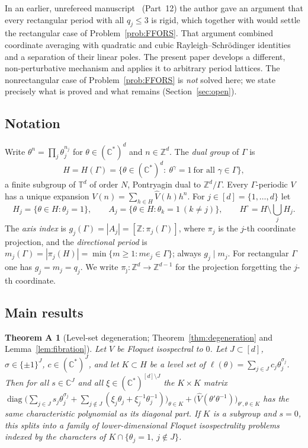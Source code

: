 \documentclass[11pt,reqno]{amsart}
\newtheorem*{theoremA}{Theorem A}
\theoremstyle{definition}
\theoremstyle{remark}
\newcommand{\C}{\mathbb C}
\newcommand{\Z}{\mathbb Z}
\newcommand{\T}{\mathbb T}
\DeclareMathOperator{\diag}{diag}
\begin{document}
In an earlier, unrefereed manuscript~\cite{KeioGPT} (Part~12) the author gave an
argument that every rectangular period with all $q_j\le3$ is rigid, which
together with \cite[Theorem~C]{CFK2026} would settle the rectangular case of
Problem~\ref{prob:FFORS}.  That argument combined coordinate averaging with
quadratic and cubic Rayleigh--Schr\"odinger identities and a separation of
their linear poles.  The present paper develops a different, non-perturbative
mechanism and applies it to arbitrary period lattices.  The nonrectangular
case of Problem~\ref{prob:FFORS} is \emph{not} solved here; we state precisely
what is proved and what remains (Section~\ref{sec:open}).

\subsection{Notation}
Write $\theta^n=\prod_j\theta_j^{n_j}$ for $\theta\in(\C^*)^d$ and $n\in\Z^d$.
The \emph{dual group} of $\Gamma$ is
\[
 H=H(\Gamma)=\{\theta\in(\C^*)^d:\ \theta^\gamma=1\ \text{for all }\gamma\in\Gamma\},
\]
a finite subgroup of $\T^d$ of order $N$, Pontryagin dual to $\Z^d/\Gamma$.
Every $\Gamma$-periodic $V$ has a unique expansion
$V(n)=\sum_{h\in H}\widehat V(h)h^n$.  For $j\in[d]=\{1,\dots,d\}$ let
\[
 H_j=\{\theta\in H:\theta_j=1\},\qquad
 A_j=\{\theta\in H:\theta_k=1\ (k\ne j)\},\qquad
 H^\circ=H\setminus\textstyle\bigcup_jH_j .
\]
The \emph{axis index} is $g_j(\Gamma)=|A_j|=[\Z:\pi_j(\Gamma)]$, where $\pi_j$ is
the $j$-th coordinate projection, and the \emph{directional period} is
$m_j(\Gamma)=|\pi_j(H)|=\min\{m\ge1: me_j\in\Gamma\}$; always $g_j\mid m_j$.
For rectangular $\Gamma$ one has $g_j=m_j=q_j$.  We write
$\pi_{\hat\jmath}\colon\Z^d\to\Z^{d-1}$ for the projection forgetting the $j$-th
coordinate.

\subsection{Main results}

\begin{theoremA}[Level-set degeneration; Theorem~\ref{thm:degeneration} and Lemma~\ref{lem:fibration}]
Let $V$ be Floquet isospectral to $0$.  Let $J\subset[d]$, $\sigma\in\{\pm1\}^J$,
$c\in(\C^*)^J$, and let $K\subset H$ be a level set of
$\ell(\theta)=\sum_{j\in J}c_j\theta_j^{\sigma_j}$.  Then for all $s\in\C^J$
and all $\xi\in(\C^*)^{[d]\setminus J}$ the $K\times K$ matrix
$\diag\bigl(\sum_{j\in J}s_j\theta_j^{\sigma_j}+\sum_{j\notin J}(\xi_j\theta_j+\xi_j^{-1}\theta_j^{-1})\bigr)_{\theta\in K}
 +\bigl(\widehat V(\theta'\theta^{-1})\bigr)_{\theta',\theta\in K}$
has the same characteristic polynomial as its diagonal part.  If $K$ is a
subgroup and $s=0$, this splits into a family of lower-dimensional Floquet
isospectrality problems indexed by the characters of
$K\cap\{\theta_j=1,\ j\notin J\}$.
\end{theoremA}
\end{document}
